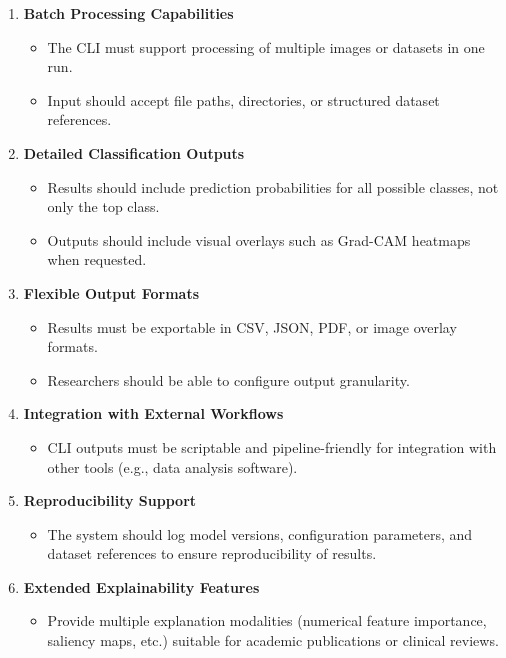 \documentclass[
  12pt,
  oneside]{article}
\providecommand{\tightlist}{%
  \setlength{\itemsep}{0pt}\setlength{\parskip}{0pt}}
\begin{document}
\begin{enumerate}
\def\labelenumi{\arabic{enumi}.}
\item
  \textbf{Batch Processing Capabilities}

  \begin{itemize}
  \tightlist
  \item
    The CLI must support processing of multiple images or datasets in
    one run.\\
  \item
    Input should accept file paths, directories, or structured dataset
    references.
  \end{itemize}
\item
  \textbf{Detailed Classification Outputs}

  \begin{itemize}
  \tightlist
  \item
    Results should include prediction probabilities for all possible
    classes, not only the top class.\\
  \item
    Outputs should include visual overlays such as Grad-CAM heatmaps
    when requested.
  \end{itemize}
\item
  \textbf{Flexible Output Formats}

  \begin{itemize}
  \tightlist
  \item
    Results must be exportable in CSV, JSON, PDF, or image overlay
    formats.\\
  \item
    Researchers should be able to configure output granularity.
  \end{itemize}
\item
  \textbf{Integration with External Workflows}

  \begin{itemize}
  \tightlist
  \item
    CLI outputs must be scriptable and pipeline-friendly for integration
    with other tools (e.g., data analysis software).
  \end{itemize}
\item
  \textbf{Reproducibility Support}

  \begin{itemize}
  \tightlist
  \item
    The system should log model versions, configuration parameters, and
    dataset references to ensure reproducibility of results.
  \end{itemize}
\item
  \textbf{Extended Explainability Features}

  \begin{itemize}
  \tightlist
  \item
    Provide multiple explanation modalities (numerical feature
    importance, saliency maps, etc.) suitable for academic publications
    or clinical reviews.
  \end{itemize}
\end{enumerate}
\end{document}
